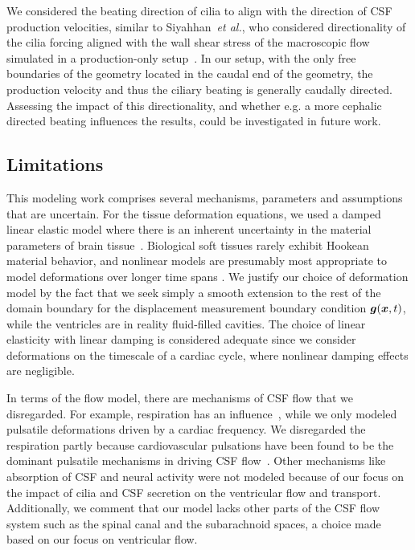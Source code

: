 \documentclass{template}
\begin{document}
We considered the beating direction of cilia to align with the direction of 
CSF production velocities, similar to Siyahhan~\emph{et al.}, who considered
directionality of the cilia forcing aligned
with the wall shear stress of the macroscopic flow simulated in a
production-only setup~\cite{Siyahhan2014FlowVentricles}.
In our setup, with the only free boundaries of the geometry located
in the caudal end of the geometry, the production velocity and thus
the ciliary beating is generally caudally directed. Assessing the impact
of this directionality, and whether e.g. a more cephalic directed beating
influences the results, could be investigated in future work.

\subsection{Limitations}
\label{subsec:limitations}

This modeling work comprises several mechanisms, parameters and
assumptions that are uncertain.
For the tissue deformation equations, we used a damped linear elastic model
where there is an inherent
uncertainty in the material parameters
of brain tissue~\cite{smillie2005hydroelastic}.
Biological soft tissues rarely exhibit Hookean material behavior,
and nonlinear models are presumably most appropriate to
model deformations over longer time spans
\cite{Cheng2010ComputationalModel, Cheng2007UnconfinedCompression,
smillie2005hydroelastic, tully2009coupling, kaczmarek1997hydromechanics}.
We justify our choice of deformation model by the fact that
we seek simply a smooth extension to the rest of the domain boundary
for the displacement measurement boundary condition $\bm{g}(\bm{x}, t)$,
while the ventricles are in reality fluid-filled cavities.
The choice of linear elasticity with linear damping is considered
adequate since we consider deformations on the timescale of a cardiac cycle,
where nonlinear damping effects are negligible.

In terms of the flow model, there are mechanisms of CSF flow that we disregarded.
For example, respiration has an influence~\cite{Vinje2019RespiratoryMeasurements},
while we only modeled pulsatile deformations driven by a cardiac frequency.
We disregarded the respiration partly because cardiovascular pulsations
have been found to be the dominant pulsatile mechanisms
in driving CSF flow~\cite{Soderstrom2025}. Other mechanisms like 
absorption of CSF and neural activity were not modeled because 
of our focus on the impact of cilia and CSF secretion on the
ventricular flow and transport.
Additionally, we comment that our model lacks other
parts of the CSF flow system such
as the spinal canal and the subarachnoid spaces,
a choice made based on our focus on ventricular flow. 
\end{document}
